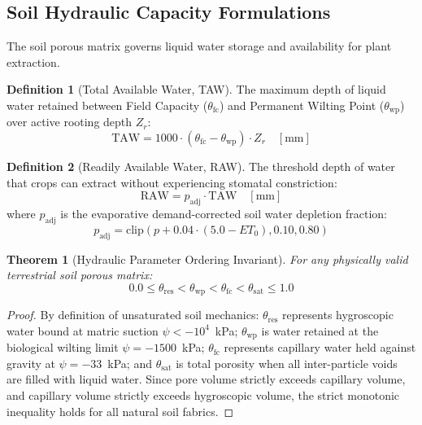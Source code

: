 \documentclass[11pt,a4paper]{article}
\newtheorem{theorem}{Theorem}[section]
\theoremstyle{definition}
\newtheorem{definition}{Definition}[section]
\theoremstyle{remark}
\begin{document}
\subsection{Soil Hydraulic Capacity Formulations}
The soil porous matrix governs liquid water storage and availability for plant extraction.

\begin{definition}[Total Available Water, TAW]
The maximum depth of liquid water retained between Field Capacity ($\theta_{\text{fc}}$) and Permanent Wilting Point ($\theta_{\text{wp}}$) over active rooting depth $Z_r$:
\begin{equation}
    \label{eq:taw}
    \text{TAW} = 1000 \cdot (\theta_{\text{fc}} - \theta_{\text{wp}}) \cdot Z_r \quad [\text{mm}]
\end{equation}
\end{definition}

\begin{definition}[Readily Available Water, RAW]
The threshold depth of water that crops can extract without experiencing stomatal constriction:
\begin{equation}
    \label{eq:raw}
    \text{RAW} = p_{\text{adj}} \cdot \text{TAW} \quad [\text{mm}]
\end{equation}
where $p_{\text{adj}}$ is the evaporative demand-corrected soil water depletion fraction:
\begin{equation}
    p_{\text{adj}} = \text{clip}\left( p + 0.04 \cdot (5.0 - ET_0), 0.10, 0.80 \right)
\end{equation}
\end{definition}

\begin{theorem}[Hydraulic Parameter Ordering Invariant]
For any physically valid terrestrial soil porous matrix:
\begin{equation}
    0.0 \le \theta_{\text{res}} < \theta_{\text{wp}} < \theta_{\text{fc}} < \theta_{\text{sat}} \le 1.0
\end{equation}
\end{theorem}
\begin{proof}
By definition of unsaturated soil mechanics: $\theta_{\text{res}}$ represents hygroscopic water bound at matric suction $\psi < -10^4$~kPa; $\theta_{\text{wp}}$ is water retained at the biological wilting limit $\psi = -1500$~kPa; $\theta_{\text{fc}}$ represents capillary water held against gravity at $\psi = -33$~kPa; and $\theta_{\text{sat}}$ is total porosity when all inter-particle voids are filled with liquid water. Since pore volume strictly exceeds capillary volume, and capillary volume strictly exceeds hygroscopic volume, the strict monotonic inequality holds for all natural soil fabrics.
\end{proof}
\end{document}
